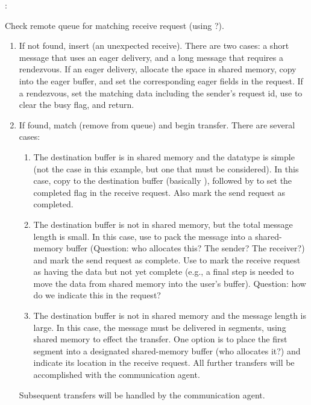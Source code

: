 :

Check remote queue for matching receive request (using
?).  
\begin{enumerate}
\item If not found, insert (an unexpected receive).  There are two cases: a
  short message that uses an eager delivery, and a long message that requires
  a rendezvous.  If an eager delivery, allocate the space in shared memory,
  copy into the eager buffer, and set the corresponding eager fields in the
  request.  If a rendezvous, set the matching data
  including the sender's 
  request id, use  to clear the busy flag, and
  return.  
\item If found, match (remove from queue) and begin transfer.  There are
  several cases:
    \begin{enumerate}
    \item The destination buffer is in shared memory and the datatype is
      simple (not the case in this example, but one that must be considered). 
      In this case, copy to the destination buffer (basically
      ), followed by  to set
      the completed flag in the receive request.  Also mark the send request
      as completed.
    \item The destination buffer is not in shared memory, but the total
      message length is small.  In this case, use  to pack
      the message into a shared-memory buffer (Question: who allocates this?
      The sender?  The receiver?) and mark the send request as complete.
      Use  to mark the receive request as having
      the data but not yet complete (e.g., a final step is needed to move the
      data from shared memory into the user's buffer).  Question: how do we
      indicate this in the request?
    \item The destination buffer is not in shared memory and the message
      length is large.  In this case, the message must be delivered in
      segments, using shared memory to effect the transfer.  One option is to
      place the first segment into a designated shared-memory buffer (who
      allocates it?) and indicate its location in the receive request.  All
      further transfers will be accomplished with the communication agent.
    \end{enumerate}
    Subsequent transfers will be handled by the communication agent.
\end{enumerate}

